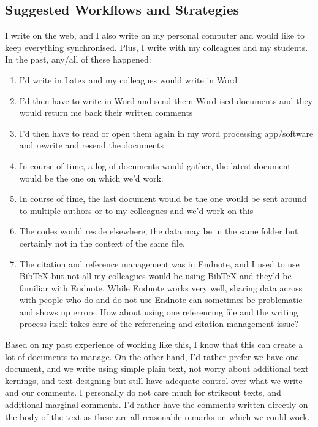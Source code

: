 \subsection{Suggested Workflows and Strategies}

I write on the web, and I also write on my personal computer and would like to keep everything synchronised. Plus, I write with my colleagues and my students. In the past, any/all of these happened:

\begin{enumerate}
\item I'd write in Latex and my colleagues would write in Word
\item I'd then have to write in Word and send them Word-ised documents and they would return me back their written comments
\item I'd then have to read or open them again in my word processing app/software and rewrite and resend the documents
\item In course of time, a log of documents would gather, the latest document would be the one on which we'd work.
\item In course of time, the last document would be the one would be sent around to multiple authors or to my colleagues and we'd work on this
\item The codes would reside elsewhere, the data may be in the same folder but certainly not in the context of the same file. 
\item The citation and reference management was in Endnote, and I used to use BibTeX but not all my colleagues would be using BibTeX and they'd be familiar with Endnote. While Endnote works very well, sharing data across with people who do and do not use Endnote can sometimes be problematic and shows up errors. How about using one referencing file and the writing process itself takes care of the referencing and citation management issue?
\end{enumerate}

Based on my past experience of working like this, I know that this can create a lot of documents to manage. On the other hand, I'd rather prefer we have one document, and we write using simple plain text, not worry about additional text kernings, and text designing but still have adequate control over what we write and our comments. I personally do not care much for strikeout texts, and additional marginal comments. I'd rather have the comments written directly on the body of the text as these are all reasonable remarks on which we could work. 


